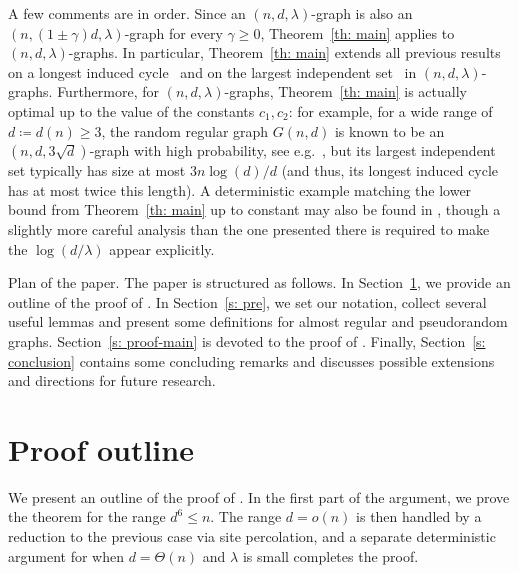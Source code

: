 \documentclass[reqno,a4paper]{amsart}
\makeatletter
\def\paragraph{\@startsection{paragraph}{4}%
  \z@{3pt}{-\fontdimen2\font}%
  {\normalfont\bfseries}}
\theoremstyle{definition}
\makeatother
\begin{document}
A few comments are in order.
Since an $(n,d,\lambda)$-graph is also an $(n, (1\pm\gamma)d, \lambda)$-graph for every $\gamma\ge 0$, Theorem~\ref{th: main} applies to $(n,d,\lambda)$-graphs. 
In particular, Theorem~\ref{th: main} extends all previous results on a longest induced cycle~\cite{DKMZ25,DK25,FJ87} and on the largest independent set~\cite{AKS99,KS06} in $(n,d,\lambda)$-graphs.
Furthermore, for $(n,d,\lambda)$-graphs, Theorem~\ref{th: main} is actually optimal up to the value of the constants $c_1,c_2$: for example, for a wide range of $d\coloneq d(n)\ge 3$, the random regular graph $G(n,d)$ is known to be an $(n,d,3\sqrt{d})$-graph with high probability, see e.g.~\cite{zbMATH05037081,Pud15,zbMATH07751065,zbMATH07036340}, but its largest independent set typically has size at most $3n\log(d)/d$ (and thus, its longest induced cycle has at most twice this length).
A deterministic example matching the lower bound from Theorem~\ref{th: main} up to constant may also be found in \cite[Section~5]{DKMZ25}, though a slightly more careful analysis than the one presented there is required to make the $\log(d/\lambda)$ appear explicitly.

\paragraph{Plan of the paper.} The paper is structured as follows. In Section~\ref{s: outline}, we provide an outline of the proof of . 
In Section~\ref{s: pre}, we set our notation, collect several useful lemmas and present some definitions for almost regular and pseudorandom graphs. 
Section~\ref{s: proof-main} is devoted to the proof of . Finally, Section~\ref{s: conclusion} contains some concluding remarks and discusses possible extensions and directions for future research.

\section{Proof outline}\label{s: outline}
We present an outline of the proof of . 
In the first part of the argument, we prove the theorem for the range $d^6\le n$. 
The range $d=o(n)$ is then handled by a reduction to the previous case via site percolation,
and a separate deterministic argument for when $d=\Theta(n)$ and $\lambda$ is small completes the proof.
\end{document}
